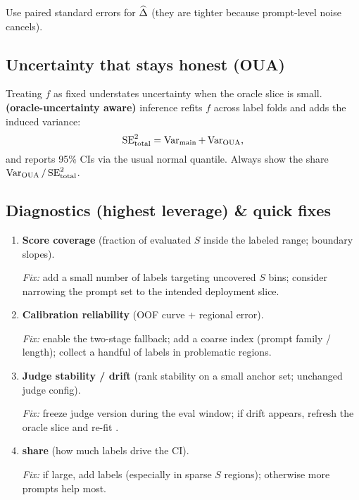 Use paired standard errors for $\widehat{\Delta}$ (they are tighter because prompt-level noise cancels).

\subsection{Uncertainty that stays honest (OUA)}

Treating $f$ as fixed understates uncertainty when the oracle slice is small. \textbf{\oua{} (oracle-uncertainty aware)} inference refits $f$ across label folds and adds the induced variance:
\begin{equation}
\operatorname{SE}^2_{\text{total}} = \operatorname{Var}_{\text{main}} + \operatorname{Var}_{\text{OUA}},
\end{equation}
and reports 95\% CIs via the usual normal quantile. Always show the \oua{} share $\operatorname{Var}_{\text{OUA}}/\operatorname{SE}^2_{\text{total}}$.

\subsection{Diagnostics (highest leverage) \& quick fixes}

\begin{enumerate}[label=(\alph*)]
\item \textbf{Score coverage} (fraction of evaluated $S$ inside the labeled range; boundary slopes).

\emph{Fix:} add a small number of labels targeting uncovered $S$ bins; consider narrowing the prompt set to the intended deployment slice.

\item \textbf{Calibration reliability} (OOF curve + regional error).

\emph{Fix:} enable the two-stage \autocal{} fallback; add a coarse index (prompt family / length); collect a handful of labels in problematic regions.

\item \textbf{Judge stability / drift} (rank stability on a small anchor set; unchanged judge config).

\emph{Fix:} freeze judge version during the eval window; if drift appears, refresh the oracle slice and re-fit \autocal.

\item \textbf{\oua{} share} (how much labels drive the CI).

\emph{Fix:} if large, add labels (especially in sparse $S$ regions); otherwise more prompts help most.
\end{enumerate}

